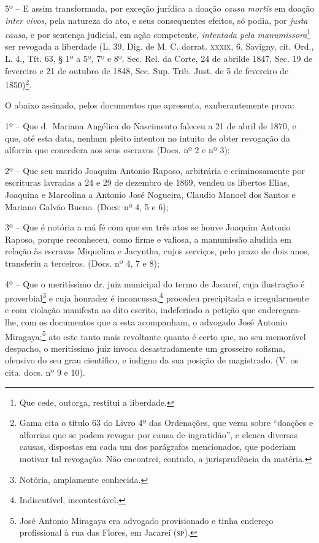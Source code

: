 5º -- E assim transformada, por exceção jurídica a doação \emph{causa
mortis} em doação \emph{inter vivos}, pela natureza do ato, e seus
consequentes efeitos, só podia, por \emph{justa causa}, e por sentença
judicial, em ação competente, \emph{intentada pela
manumissora}\footnote{ Que cede, outorga, restitui a liberdade.} ser
revogada a liberdade (L. 39, Dig. de M. C. dorrat. \textsc{xxxix}, 6, Savigny,
cit. Ord., L. 4., Tít. 63, § 1º a 5º, 7º e 8º, Sec. Rel. da Corte, 24 de
abrilde 1847, Sec. 19 de fevereiro e 21 de outubro de 1848, Sec. Sup.
Trib. Just. de 5 de fevereiro de 1850)\footnote{ Gama cita o título 63
  do Livro 4º das Ordenações, que versa sobre ``doações e alforrias
  que se podem revogar por causa de ingratidão'', e elenca diversas
  causas, dispostas em cada um dos parágrafos mencionados, que poderiam
  motivar tal revogação. Não encontrei, contudo, a jurisprudência da
  matéria.}.

O abaixo assinado, pelos documentos que apresenta, exuberantemente
prova:

1º -- Que d.~Mariana Angélica do Nascimento faleceu a 21 de abril de
1870, e que, até esta data, nenhum pleito intentou no intuito de obter
revogação da alforria que concedera aos seus escravos (Docs. nº 2 e nº
3);

2º -- Que seu marido Joaquim Antonio Raposo, arbitrária e criminosamente
por escrituras lavradas a 24 e 29 de dezembro de 1869, vendeu os
libertos Elias, Joaquina e Marcolina a Antonio José Nogueira, Claudio
Manoel dos Santos e Mariano Galvão Bueno. (Docs: nº 4, 5 e 6);

3º -- Que é notória a má fé com que em três atos se houve Joaquim
Antonio Raposo, porque reconheceu, como firme e valiosa, a manumissão
aludida em relação às escravas Miquelina e Jacyntha, cujos serviços,
pelo prazo de dois anos, transferiu a terceiros. (Docs. nº 4, 7 e 8);

4º -- Que o meritíssimo dr. juiz municipal do termo de Jacareí, cuja
ilustração é proverbial\footnote{ Notória, amplamente conhecida.} e
cuja honradez é inconcussa,\footnote{ Indiscutível, incontestável.}
procedeu precipitada e irregularmente e com violação manifesta ao dito
escrito, indeferindo a petição que endereçara-lhe, com os documentos que
a esta acompanham, o advogado José Antonio Miragaya;\footnote{ José
  Antonio Miragaya era advogado provisionado e tinha endereço
  profissional à rua das Flores, em Jacareí (\textsc{sp}).} ato este tanto mais
revoltante quanto é certo que, no seu memorável despacho, o meritíssimo
juiz invoca desastradamente um grosseiro sofisma, ofensivo do seu grau
científico, e indigno da sua posição de magistrado. (V. os cita. docs.
nº 9 e 10).

